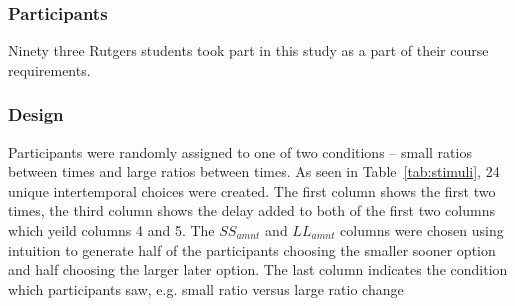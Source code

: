 \documentclass[]{article}
\begin{document}
\subsubsection{Participants}

Ninety three Rutgers students took part in this study as a part of their course requirements. 

\subsubsection{Design}

Participants were randomly assigned to one of two conditions -- small ratios between times and large ratios between times.  
As seen in Table~\ref{tab:stimuli}, 24 unique intertemporal choices were created. 
The first column shows the first two times, the third column shows the delay added to both of the first two columns which yeild columns 4 and 5. 
The $SS_{amnt}$ and $LL_{amnt}$ columns were chosen using intuition to generate half of the participants choosing the smaller sooner option and half choosing the larger later option. 
The last column indicates the condition which participants saw, e.g. small ratio versus large ratio change

\end{document}
